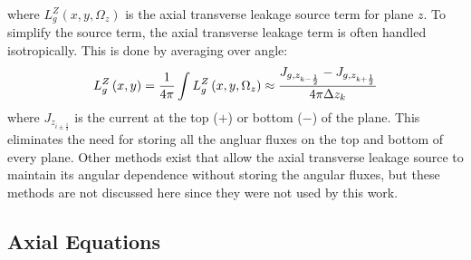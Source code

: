 where $L_{g}^Z\left(x,y,\Omega_z\right)$ is the axial transverse leakage source term for plane $z$.  To simplify the source term, the axial transverse leakage term is often handled isotropically.  This is done by averaging over angle:
\begin{equation}
L_{g}^Z\left(x,y\right) = \frac{1}{4\pi}\intop L_{g}^Z\left(x,y,\Omega_z\right) \approx \frac{J_{g,z_{k-\frac{1}{2}}} - J_{g,z_{k+\frac{1}{2}}}}{4\pi\Delta z_k}
\end{equation}
where $J_{z_{i\pm \frac{1}{2}}}$ is the current at the top ($+$) or bottom ($-$) of the plane.  This eliminates the need for storing all the angluar fluxes on the top and bottom of every plane.  Other methods exist that allow the axial transverse leakage source to maintain its angular dependence without storing the angular fluxes, but these methods are not discussed here since they were not used by this work.

\subsection{Axial Equations}

